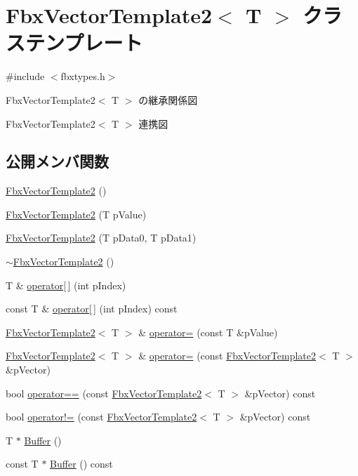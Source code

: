 \hypertarget{class_fbx_vector_template2}{}\section{Fbx\+Vector\+Template2$<$ T $>$ クラステンプレート}
\label{class_fbx_vector_template2}


{\ttfamily \#include $<$fbxtypes.\+h$>$}



Fbx\+Vector\+Template2$<$ T $>$ の継承関係図


Fbx\+Vector\+Template2$<$ T $>$ 連携図
\subsection*{公開メンバ関数}
\begin{DoxyCompactItemize}
\item 
\hyperlink{class_fbx_vector_template2_a5ed1ade2c2a43c5a5369072a9bde87b4}{Fbx\+Vector\+Template2} ()
\item 
\hyperlink{class_fbx_vector_template2_a261d0bfc0f191c9908b176909484d7a9}{Fbx\+Vector\+Template2} (T p\+Value)
\item 
\hyperlink{class_fbx_vector_template2_ab7f314b07663cf74dc1dc638d1b6502d}{Fbx\+Vector\+Template2} (T p\+Data0, T p\+Data1)
\item 
\hyperlink{class_fbx_vector_template2_a408867e7a66b93c809934cc39109d3f9}{$\sim$\+Fbx\+Vector\+Template2} ()
\item 
T \& \hyperlink{class_fbx_vector_template2_a51038dd841fd61f144304acbf26c2eb9}{operator\mbox{[}$\,$\mbox{]}} (int p\+Index)
\item 
const T \& \hyperlink{class_fbx_vector_template2_a87dc10a49d55552616bafa4f6bca26fa}{operator\mbox{[}$\,$\mbox{]}} (int p\+Index) const
\item 
\hyperlink{class_fbx_vector_template2}{Fbx\+Vector\+Template2}$<$ T $>$ \& \hyperlink{class_fbx_vector_template2_ad30461b620c236ca3914e078aa3a74a9}{operator=} (const T \&p\+Value)
\item 
\hyperlink{class_fbx_vector_template2}{Fbx\+Vector\+Template2}$<$ T $>$ \& \hyperlink{class_fbx_vector_template2_acc052cfaef7530489fdc47ffea2ed78e}{operator=} (const \hyperlink{class_fbx_vector_template2}{Fbx\+Vector\+Template2}$<$ T $>$ \&p\+Vector)
\item 
bool \hyperlink{class_fbx_vector_template2_ad9921dfc627c8fba190e708555d21c84}{operator==} (const \hyperlink{class_fbx_vector_template2}{Fbx\+Vector\+Template2}$<$ T $>$ \&p\+Vector) const
\item 
bool \hyperlink{class_fbx_vector_template2_a892290b45c2afa593e89c8c8ee7ab51d}{operator!=} (const \hyperlink{class_fbx_vector_template2}{Fbx\+Vector\+Template2}$<$ T $>$ \&p\+Vector) const
\item 
T $\ast$ \hyperlink{class_fbx_vector_template2_a117a7f35111300b865b648e46b18dcdd}{Buffer} ()
\item 
const T $\ast$ \hyperlink{class_fbx_vector_template2_a804f4c622838c2bbef16fb6878033741}{Buffer} () const
\end{DoxyCompactItemize}
